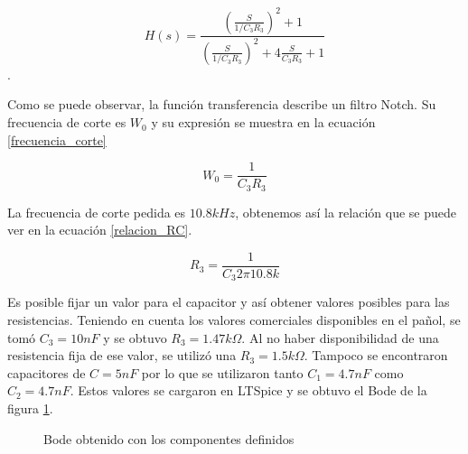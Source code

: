 \begin{equation} H(s) = \frac{(\frac{S}{1/C_{3} R_{3}})^2 + 1} {(\frac{S}{1/C_{3}R_{3}})^2 + 4\frac{S}{C_{3}R_{3}} + 1}  \label{transferencia_1}\end{equation}.

Como se puede observar, la función transferencia describe un filtro Notch. Su frecuencia de corte es
$W_0$ y su expresión se muestra en la ecuación \ref{frecuencia_corte}

\begin{equation} W_{0} =  \frac{1}{C_{3} R_{3}}  \label{frecuencia_corte}\end{equation}

La frecuencia de corte pedida es $10.8k Hz$, obtenemos así la relación que se puede ver en la ecuación \ref{relacion_RC}.

\begin{equation} R_{3} = \frac{1}{C_{3} 2\pi 10.8k} \label{relacion_RC}\end{equation}

Es posible fijar un valor para el capacitor y así obtener valores posibles para las resistencias. Teniendo en cuenta los valores comerciales disponibles en el pañol, se tomó $C_{3} = 10nF$ y se obtuvo $R_{3}=1.47k\Omega$. Al no haber disponibilidad de una resistencia fija de ese valor, se utilizó una $R_{3}=1.5k\Omega$. Tampoco se encontraron capacitores de $C = 5nF$ por lo que se utilizaron tanto $C_{1} = 4.7nF$ como  $C_{2} = 4.7nF$. Estos valores se cargaron en LTSpice y se obtuvo el Bode de la figura \ref{fig:bode_ltspice_teorico}.


\begin{figure}[H] 
\begin{center}
\caption{Bode obtenido con los componentes definidos}
\label{fig:bode_ltspice_teorico}
\end{center}
\end{figure}

